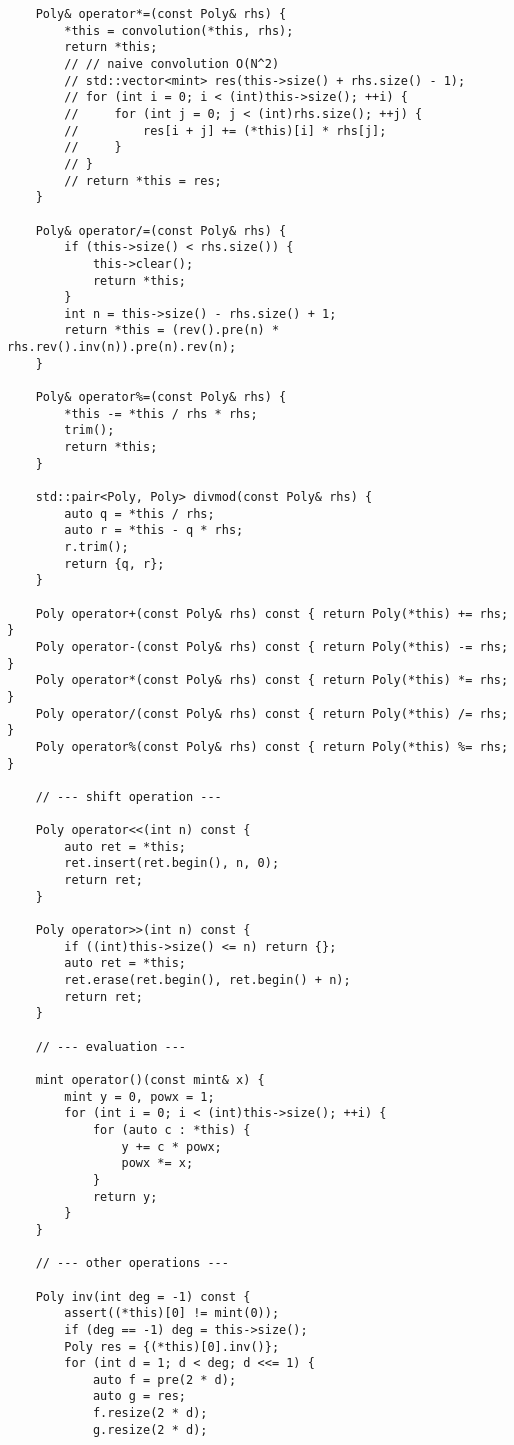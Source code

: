 \begin{lstlisting}
    Poly& operator*=(const Poly& rhs) {
        *this = convolution(*this, rhs);
        return *this;
        // // naive convolution O(N^2)
        // std::vector<mint> res(this->size() + rhs.size() - 1);
        // for (int i = 0; i < (int)this->size(); ++i) {
        //     for (int j = 0; j < (int)rhs.size(); ++j) {
        //         res[i + j] += (*this)[i] * rhs[j];
        //     }
        // }
        // return *this = res;
    }

    Poly& operator/=(const Poly& rhs) {
        if (this->size() < rhs.size()) {
            this->clear();
            return *this;
        }
        int n = this->size() - rhs.size() + 1;
        return *this = (rev().pre(n) * rhs.rev().inv(n)).pre(n).rev(n);
    }

    Poly& operator%=(const Poly& rhs) {
        *this -= *this / rhs * rhs;
        trim();
        return *this;
    }

    std::pair<Poly, Poly> divmod(const Poly& rhs) {
        auto q = *this / rhs;
        auto r = *this - q * rhs;
        r.trim();
        return {q, r};
    }

    Poly operator+(const Poly& rhs) const { return Poly(*this) += rhs; }
    Poly operator-(const Poly& rhs) const { return Poly(*this) -= rhs; }
    Poly operator*(const Poly& rhs) const { return Poly(*this) *= rhs; }
    Poly operator/(const Poly& rhs) const { return Poly(*this) /= rhs; }
    Poly operator%(const Poly& rhs) const { return Poly(*this) %= rhs; }

    // --- shift operation ---

    Poly operator<<(int n) const {
        auto ret = *this;
        ret.insert(ret.begin(), n, 0);
        return ret;
    }

    Poly operator>>(int n) const {
        if ((int)this->size() <= n) return {};
        auto ret = *this;
        ret.erase(ret.begin(), ret.begin() + n);
        return ret;
    }

    // --- evaluation ---

    mint operator()(const mint& x) {
        mint y = 0, powx = 1;
        for (int i = 0; i < (int)this->size(); ++i) {
            for (auto c : *this) {
                y += c * powx;
                powx *= x;
            }
            return y;
        }
    }

    // --- other operations ---

    Poly inv(int deg = -1) const {
        assert((*this)[0] != mint(0));
        if (deg == -1) deg = this->size();
        Poly res = {(*this)[0].inv()};
        for (int d = 1; d < deg; d <<= 1) {
            auto f = pre(2 * d);
            auto g = res;
            f.resize(2 * d);
            g.resize(2 * d);


\end{lstlisting}

